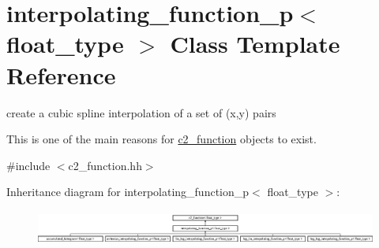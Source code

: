 \hypertarget{classinterpolating__function__p}{\section{interpolating\-\_\-function\-\_\-p$<$ float\-\_\-type $>$ Class Template Reference}
\label{classinterpolating__function__p}
}


create a cubic spline interpolation of a set of (x,y) pairs

This is one of the main reasons for \hyperlink{classc2__function}{c2\-\_\-function} objects to exist.  




{\ttfamily \#include $<$c2\-\_\-function.\-hh$>$}

Inheritance diagram for interpolating\-\_\-function\-\_\-p$<$ float\-\_\-type $>$\-:\begin{figure}[H]
\begin{center}
\leavevmode
\includegraphics[height=1.138983cm]{classinterpolating__function__p}
\end{center}
\end{figure}
